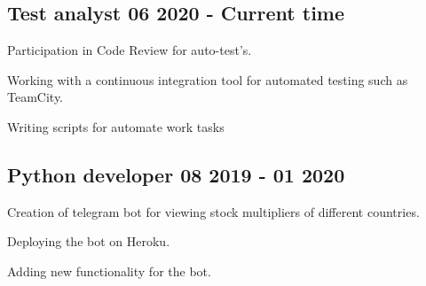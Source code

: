 \documentclass[a4paper,12pt]{article}
\begin{document}

\vspace*{10pt}

\subsection{{Test analyst }\hfill 06 2020 - Current time}
\begin{zitemize}
\item Participation in Code Review for auto-test's.
\item Working with a continuous integration tool for automated testing such as TeamCity.
\item Writing scripts for automate work tasks
\end{zitemize}

\vspace*{6pt}

\subsection{{Python developer }\hfill 08 2019 - 01 2020}
\begin{zitemize}
\item Creation of telegram bot for viewing stock multipliers of different countries.
\item Deploying the bot on Heroku.
\item Adding new functionality for the bot.
\end{zitemize}

\end{document}
